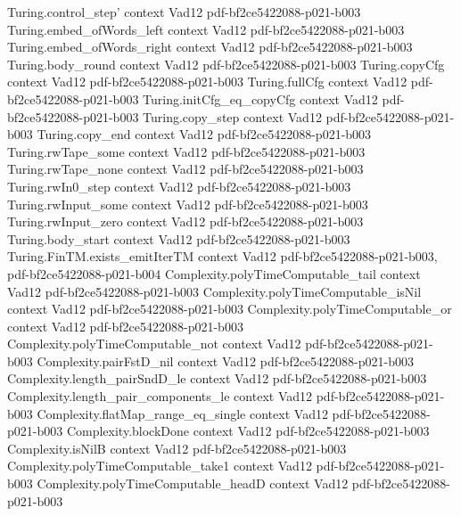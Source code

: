 \begin{theorem}
  {Turing.control_step'}
  {context}
  {Vad12}
  {pdf-bf2ce5422088-p021-b003}
\proofstep
  {Turing.embed_ofWords_left}
  {context}
  {Vad12}
  {pdf-bf2ce5422088-p021-b003}
\proofstep
  {Turing.embed_ofWords_right}
  {context}
  {Vad12}
  {pdf-bf2ce5422088-p021-b003}
\proofstep
  {Turing.body_round}
  {context}
  {Vad12}
  {pdf-bf2ce5422088-p021-b003}
\proofstep
  {Turing.copyCfg}
  {context}
  {Vad12}
  {pdf-bf2ce5422088-p021-b003}
\proofstep
  {Turing.fullCfg}
  {context}
  {Vad12}
  {pdf-bf2ce5422088-p021-b003}
\proofstep
  {Turing.initCfg_eq_copyCfg}
  {context}
  {Vad12}
  {pdf-bf2ce5422088-p021-b003}
\proofstep
  {Turing.copy_step}
  {context}
  {Vad12}
  {pdf-bf2ce5422088-p021-b003}
\proofstep
  {Turing.copy_end}
  {context}
  {Vad12}
  {pdf-bf2ce5422088-p021-b003}
\proofstep
  {Turing.rwTape_some}
  {context}
  {Vad12}
  {pdf-bf2ce5422088-p021-b003}
\proofstep
  {Turing.rwTape_none}
  {context}
  {Vad12}
  {pdf-bf2ce5422088-p021-b003}
\proofstep
  {Turing.rwIn0_step}
  {context}
  {Vad12}
  {pdf-bf2ce5422088-p021-b003}
\proofstep
  {Turing.rwInput_some}
  {context}
  {Vad12}
  {pdf-bf2ce5422088-p021-b003}
\proofstep
  {Turing.rwInput_zero}
  {context}
  {Vad12}
  {pdf-bf2ce5422088-p021-b003}
\proofstep
  {Turing.body_start}
  {context}
  {Vad12}
  {pdf-bf2ce5422088-p021-b003}
\proofstep
  {Turing.FinTM.exists_emitIterTM}
  {context}
  {Vad12}
  {pdf-bf2ce5422088-p021-b003,
    pdf-bf2ce5422088-p021-b004}
\proofstep
  {Complexity.polyTimeComputable_tail}
  {context}
  {Vad12}
  {pdf-bf2ce5422088-p021-b003}
\proofstep
  {Complexity.polyTimeComputable_isNil}
  {context}
  {Vad12}
  {pdf-bf2ce5422088-p021-b003}
\proofstep
  {Complexity.polyTimeComputable_or}
  {context}
  {Vad12}
  {pdf-bf2ce5422088-p021-b003}
\proofstep
  {Complexity.polyTimeComputable_not}
  {context}
  {Vad12}
  {pdf-bf2ce5422088-p021-b003}
\proofstep
  {Complexity.pairFstD_nil}
  {context}
  {Vad12}
  {pdf-bf2ce5422088-p021-b003}
\proofstep
  {Complexity.length_pairSndD_le}
  {context}
  {Vad12}
  {pdf-bf2ce5422088-p021-b003}
\proofstep
  {Complexity.length_pair_components_le}
  {context}
  {Vad12}
  {pdf-bf2ce5422088-p021-b003}
\proofstep
  {Complexity.flatMap_range_eq_single}
  {context}
  {Vad12}
  {pdf-bf2ce5422088-p021-b003}
\proofstep
  {Complexity.blockDone}
  {context}
  {Vad12}
  {pdf-bf2ce5422088-p021-b003}
\proofstep
  {Complexity.isNilB}
  {context}
  {Vad12}
  {pdf-bf2ce5422088-p021-b003}
\proofstep
  {Complexity.polyTimeComputable_take1}
  {context}
  {Vad12}
  {pdf-bf2ce5422088-p021-b003}
\proofstep
  {Complexity.polyTimeComputable_headD}
  {context}
  {Vad12}
  {pdf-bf2ce5422088-p021-b003}

\end{theorem}
